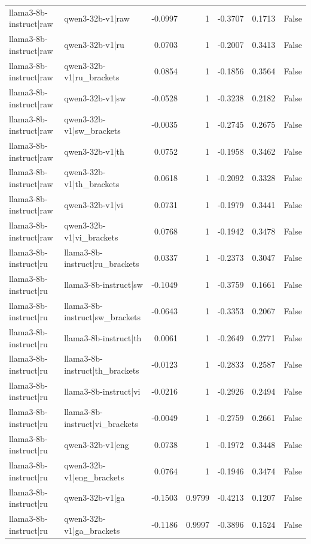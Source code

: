 \begin{table}
\begin{tabular}{l l r r r r l}
llama3-8b-instruct|raw & qwen3-32b-v1|raw & -0.0997 & 1 & -0.3707 & 0.1713 & False \\
llama3-8b-instruct|raw & qwen3-32b-v1|ru & 0.0703 & 1 & -0.2007 & 0.3413 & False \\
llama3-8b-instruct|raw & qwen3-32b-v1|ru_brackets & 0.0854 & 1 & -0.1856 & 0.3564 & False \\
llama3-8b-instruct|raw & qwen3-32b-v1|sw & -0.0528 & 1 & -0.3238 & 0.2182 & False \\
llama3-8b-instruct|raw & qwen3-32b-v1|sw_brackets & -0.0035 & 1 & -0.2745 & 0.2675 & False \\
llama3-8b-instruct|raw & qwen3-32b-v1|th & 0.0752 & 1 & -0.1958 & 0.3462 & False \\
llama3-8b-instruct|raw & qwen3-32b-v1|th_brackets & 0.0618 & 1 & -0.2092 & 0.3328 & False \\
llama3-8b-instruct|raw & qwen3-32b-v1|vi & 0.0731 & 1 & -0.1979 & 0.3441 & False \\
llama3-8b-instruct|raw & qwen3-32b-v1|vi_brackets & 0.0768 & 1 & -0.1942 & 0.3478 & False \\
llama3-8b-instruct|ru & llama3-8b-instruct|ru_brackets & 0.0337 & 1 & -0.2373 & 0.3047 & False \\
llama3-8b-instruct|ru & llama3-8b-instruct|sw & -0.1049 & 1 & -0.3759 & 0.1661 & False \\
llama3-8b-instruct|ru & llama3-8b-instruct|sw_brackets & -0.0643 & 1 & -0.3353 & 0.2067 & False \\
llama3-8b-instruct|ru & llama3-8b-instruct|th & 0.0061 & 1 & -0.2649 & 0.2771 & False \\
llama3-8b-instruct|ru & llama3-8b-instruct|th_brackets & -0.0123 & 1 & -0.2833 & 0.2587 & False \\
llama3-8b-instruct|ru & llama3-8b-instruct|vi & -0.0216 & 1 & -0.2926 & 0.2494 & False \\
llama3-8b-instruct|ru & llama3-8b-instruct|vi_brackets & -0.0049 & 1 & -0.2759 & 0.2661 & False \\
llama3-8b-instruct|ru & qwen3-32b-v1|eng & 0.0738 & 1 & -0.1972 & 0.3448 & False \\
llama3-8b-instruct|ru & qwen3-32b-v1|eng_brackets & 0.0764 & 1 & -0.1946 & 0.3474 & False \\
llama3-8b-instruct|ru & qwen3-32b-v1|ga & -0.1503 & 0.9799 & -0.4213 & 0.1207 & False \\
llama3-8b-instruct|ru & qwen3-32b-v1|ga_brackets & -0.1186 & 0.9997 & -0.3896 & 0.1524 & False \\

\end{tabular}
\end{table}
